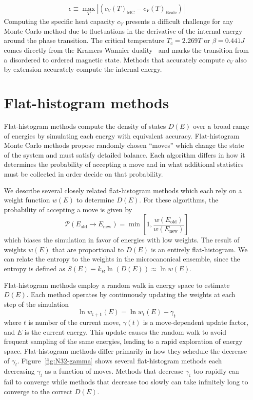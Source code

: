 \begin{align}
\epsilon \equiv \max_T \left|\left(c_V(T)_{\text{MC}} - c_V(T)_{\text{Beale}}\right)\right|
\end{align}
Computing the specific heat capacity $c_V$ presents a difficult challenge for
any Monte Carlo method due to fluctuations in the derivative of the
internal energy around the phase transition. The critical temperature $T_c = 2.
269T$ or $\beta= 0.441J$ comes directly from the Kramers-Wannier
duality~\cite{bhattacharjee1995fifty} and marks the transition from a
disordered to ordered magnetic state. Methods that accurately compute $c_V$
also by extension accurately compute the internal energy.

\section{Flat-histogram methods}\label{sec:histogram}
Flat-histogram methods compute the density of states $D(E)$ over a broad range
of energies by simulating each energy with equivalent accuracy. Flat-histogram
Monte Carlo methods propose randomly chosen ``moves'' which change the state of
the system and must satisfy detailed balance.  Each algorithm differs in how it
determines the probability of accepting a move and in what additional statistics
must be collected in order decide on that probability.

We describe several closely related flat-histogram methods which each rely on a
weight function $w(E)$ to determine $D(E)$.  For these algorithms, the
probability of accepting a move is given by
\begin{equation}
	\mathcal{P}(E_\text{old} \rightarrow E_\text{new})
	= \min\left[1,\frac{w(E_\text{old})}{w(E_\text{new})}\right]
\end{equation}
which biases the simulation in favor of energies with low weights. The result of
weights $w(E)$ that are proportional to $D(E)$ is an entirely flat-histogram. We
can relate the entropy to the weights in the microcanonical ensemble, since the
entropy is defined as $S(E) \equiv k_B\ln(D(E)) \approx \ln w(E)$.

Flat-histogram methods employ a random walk in energy space to estimate $D(E)$.  Each method operates by continuously updating the weights at each
step of the simulation
\begin{equation}
	\ln{w_{t+1}(E)}=\ln{w_{t}(E)}
	+\gamma_t
\end{equation}
where $t$ is number of the current move, $\gamma(t)$ is a move-dependent update
factor, and $E$ is the current energy.  This update causes the random walk to
avoid frequent sampling of the same energies, leading to a rapid exploration
of energy space. Flat-histogram methods differ primarily in how they schedule
the decrease of $\gamma_t$.  Figure~\ref{fig:N32-gamma} shows several
flat-histogram methods each decreasing $\gamma_t$ as a function of moves.
Methods that decrease $\gamma_t$ too rapidly can fail to converge while methods
that decrease too slowly can take infinitely long to converge to the correct
$D(E)$.


